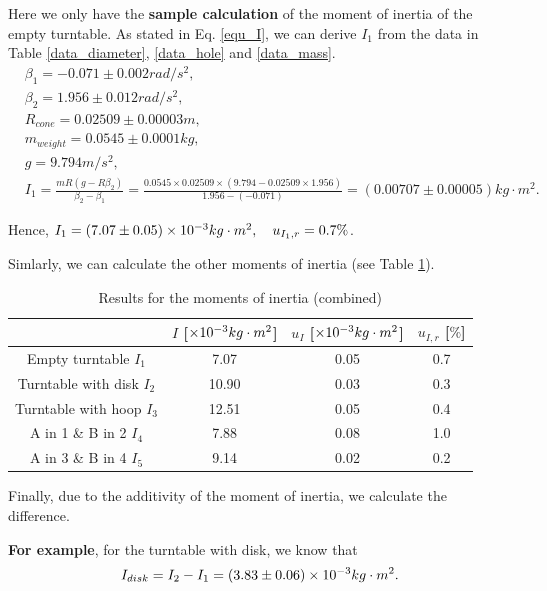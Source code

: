     Here we only have the \textbf{sample calculation} of the moment of inertia of the empty turntable.
    As stated in Eq. \ref{equ_I}, we can derive $I_1$ from the data in Table \ref{data_diameter}, \ref{data_hole} and \ref{data_mass}.
    \[
    \begin{split}
        &\beta_1=-0.071\pm 0.002 rad/s^2,\\
        &\beta_2=1.956\pm 0.012 rad/s^2,\\
        &R_{cone}=0.02509\pm0.00003 m,\\
        &m_{weight}=0.0545\pm0.0001 kg,\\
        &g=9.794m/s^2,\\
        &I_1=\frac{mR(g-R\beta_2)}{\beta_2-\beta_1}=\frac{0.0545\times0.02509\times(9.794-0.02509\times1.956)}{1.956-(-0.071)}=(0.00707\pm 0.00005)kg\cdot m^2.
    \end{split}
    \]

    Hence, $I_1=(7.07\pm 0.05) \times10^{-3}kg\cdot m^2, \quad u_{I_1,r}=0.7\%$.

    Simlarly, we can calculate the other moments of inertia (see Table \ref{data_I}).

    \begin{table}[H] \small
        \centering
        \begin{tabular}{|c|c|c|c|}
            \hline
            & $I$ [$\times10^{-3}kg\cdot m^2$] & $u_I$ [$\times10^{-3}kg\cdot m^2$] & $u_{I,r}$ [$\%$]\\\hline
            Empty turntable $I_1$ & 7.07 & 0.05 & 0.7\\\hline
            Turntable with disk $I_2$ & 10.90 & 0.03 & 0.3\\\hline
            Turntable with hoop $I_3$ & 12.51 & 0.05 & 0.4\\\hline
            A in 1 \& B in 2 $I_4$ & 7.88 & 0.08 & 1.0\\\hline
            A in 3 \& B in 4 $I_5$ & 9.14 & 0.02 & 0.2\\\hline
        \end{tabular}
        \caption{Results for the moments of inertia (combined)}\label{data_I}
    \end{table}

    Finally, due to the additivity of the moment of inertia, we calculate the difference.

    \textbf{For example}, for the turntable with disk, we know that
    \[
        I_{disk}=I_2-I_1=(3.83\pm 0.06)\times10^{-3}kg\cdot m^2.
    \]

